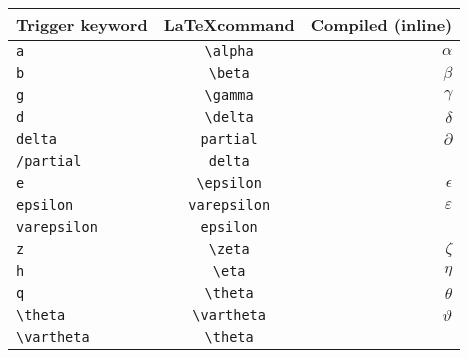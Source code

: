 \documentclass[a4paper,11pt]{scrartcl}
\numberwithin{equation}{section}
\begin{document}
\thispagestyle{plain}

\begin{table}[tb]
  \begin{center}
    \begin{tabular}{lcr}
    \hline
    \multicolumn{1}{c}{\bf Trigger keyword}    &    \multicolumn{1}{c}{\bf \LaTeX command}    &    \multicolumn{1}{c}{\bf Compiled (inline)}   \\
    \hline
    \verb|a|                     &    \verb|\alpha|                                               &    $\alpha$  \\
    \verb|b|                     &    \verb|\beta|                                                &    $\beta$  \\
    \verb|g|                     &    \verb|\gamma|                                               &    $\gamma$  \\
    \verb|d|                     &    \verb|\delta|                                               &    $\delta$  \\
    \verb|delta|                 &    \verb|partial|                                              &    $\partial$  \\
    \verb|/partial|              &    \verb|delta|                                                &    $\mbox{}$  \\
    \verb|e|                     &    \verb|\epsilon|                                             &    $\epsilon$  \\
    \verb|epsilon|               &    \verb|  varepsilon  |                                           &    $\varepsilon$  \\
    \verb|varepsilon    |            &    \verb|epsilon|                                              &    $\mbox{}$  \\
    \verb|z|                     &    \verb|\zeta|                                                &    $\zeta$  \\
    \verb|h|                     &    \verb|\eta|                                                 &    $\eta$  \\
    \verb|q|                     &    \verb|\theta|                                               &    $\theta$  \\
    \verb|\theta|                &    \verb|\vartheta|                                            &    $\vartheta$  \\
    \verb|\vartheta|             &    \verb|\theta|                                               &    \mbox{}  \\

\end{tabular}
\end{center}
\end{table}
\end{document}
